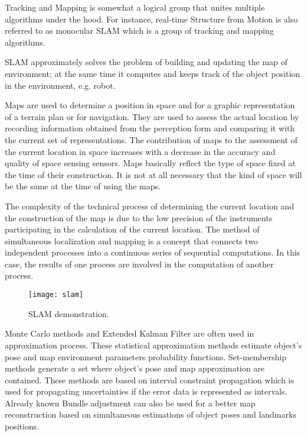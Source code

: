 \documentclass[../../../../main]{subfiles}
\begin{document}
Tracking and Mapping is somewhat a logical group that unites multiple algorithms under the hood. For instance, real-time Structure from Motion is also referred to as monocular \ac{SLAM} which is a group of tracking and mapping algorithms.

\ac{SLAM} approximately solves the problem of building and updating the map of environment; at the same time it computes and keeps track of the object position in the environment, e.g. robot. 

Maps are used to determine a position in space and for a graphic representation of a terrain plan or for navigation. They are used to assess the actual location by recording information obtained from the perception form and comparing it with the current set of representations. The contribution of maps to the assessment of the current location in space increases with a decrease in the accuracy and quality of space sensing sensors. Maps basically reflect the type of space fixed at the time of their construction. It is not at all necessary that the kind of space will be the same at the time of using the maps.

The complexity of the technical process of determining the current location and the construction of the map is due to the low precision of the instruments participating in the calculation of the current location. The method of simultaneous localization and mapping is a concept that connects two independent processes into a continuous series of sequential computations. In this case, the results of one process are involved in the computation of another process.

\begin{figure} [ht!]
    \begin{center}
        \texttt{[image: slam]}
        \caption{SLAM demonstration.}
        \label{fig:slam}
    \end{center}
\end{figure}

Monte Carlo methods and Extended Kalman Filter are often used in approximation process. These statistical approximation methods estimate object's pose and map environment parameters probability functions. Set-membership methods generate a set where object's pose and map approximation are contained. These methods are based on interval constraint propagation which is used for propagating uncertainties if the error data is represented as intervals. Already known Bundle adjustment can also be used for a better map reconstruction based on simultaneous estimations of object poses and landmarks positions.
\end{document}
